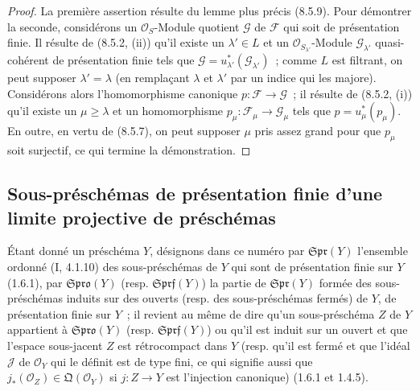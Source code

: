 \begin{proof}
La première assertion résulte du lemme plus précis (8.5.9). Pour démontrer la
seconde, considérons un $\mathcal O_S$-Module quotient $\mathcal G$ de
$\mathcal F$ qui soit de présentation finie. Il résulte de (8.5.2, (ii)) qu'il
existe un $\lambda'\in L$ et un $\mathcal O_{S_{\lambda'}}$-Module
$\mathcal G_{\lambda'}$ quasi-cohérent de présentation finie tels que
$\mathcal G=u_{\lambda'}^*(\mathcal G_{\lambda'})$~; comme $L$ est filtrant, on
peut supposer $\lambda'=\lambda$ (en remplaçant $\lambda$ et $\lambda'$ par un
indice qui les majore). Considérons alors l'homomorphisme canonique
$p:\mathcal F\to\mathcal G$~; il résulte de (8.5.2, (i)) qu'il existe un
$\mu\geq\lambda$ et un homomorphisme
$p_\mu:\mathcal F_\mu\to\mathcal G_\mu$ tels que $p=u_\mu^*(p_\mu)$. En outre,
en vertu de (8.5.7), on peut supposer $\mu$ pris assez grand pour que $p_\mu$
soit surjectif, ce qui termine la démonstration.
\end{proof}

\subsection{Sous-préschémas de présentation finie d'une limite projective de préschémas}
\label{subsection:IV.8.6-fr}

\begin{env}[8.6.1]
\label{IV.8.6.1-fr}
Étant donné un préschéma $Y$, désignons dans ce numéro par
$\mathfrak{Spr}(Y)$ l'ensemble ordonné (I, 4.1.10) des sous-préschémas de $Y$
qui sont de présentation finie sur $Y$ (1.6.1), par $\mathfrak{Spro}(Y)$
(resp. $\mathfrak{Sprf}(Y)$) la partie de $\mathfrak{Spr}(Y)$ formée des
sous-préschémas induits sur des ouverts (resp. des sous-préschémas fermés) de
$Y$, de présentation finie sur $Y$~; il revient au même de dire qu'un
sous-préschéma $Z$ de $Y$ appartient à $\mathfrak{Spro}(Y)$ (resp.
$\mathfrak{Sprf}(Y)$) ou qu'il est induit sur un ouvert et que l'espace
sous-jacent $Z$ est rétrocompact dans $Y$ (resp. qu'il est fermé et que l'idéal
$\mathcal J$ de $\mathcal O_Y$ qui le définit est de type fini, ce qui signifie
aussi que $j_*(\mathcal O_Z)\in\mathfrak Q(\mathcal O_Y)$ si $j:Z\to Y$ est
l'injection canonique) (1.6.1 et 1.4.5).
\end{env}

